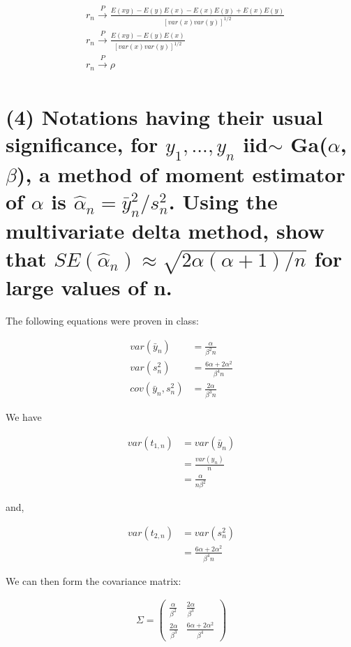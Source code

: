 \documentclass[11pt]{article}
\begin{document}
\begin{align*}
    &r_n \xrightarrow[]{P} \frac{E(xy)-E(y)E(x)-E(x)E(y)+E(x)E(y)}{[var(x)var(y)]^{1/2}}\\
    &r_n \xrightarrow[]{P} \frac{E(xy)-E(y)E(x)}{[var(x)var(y)]^{1/2}}\\
     &r_n \xrightarrow[]{P} \rho
\end{align*}


\section*{(4) Notations having their usual significance, for $y_1,...,y_n$
iid$\sim$ Ga($\alpha$,$\beta$), a
method of moment estimator of $\alpha$ is $\hat{\alpha}_n=\bar{y}^2_n / s^2_n$. Using the multivariate delta method, show that $SE(\hat{\alpha}_n) \approx \sqrt{2\alpha(\alpha+1)/n}$ for large values of n.}

 
The following equations were proven in class:

\begin{align*}
var(\bar{y}_n) &= \frac{\alpha}{\beta^2n}\\
var(s^2_n) &=\frac{6\alpha+2\alpha^2}{\beta^4n}\\
cov(\bar{y}_n, s^2_n) &= \frac{2\alpha}{\beta^3n}
    \end{align*}
    


We have

\begin{align*}
    var(t_{1,n}) &= var(\bar{y}_n)\\
    &= \frac{var(y_n)}{n} \\
    &= \frac{\alpha}{n\beta^2}
\end{align*}

and,

\begin{align*}
    var(t_{2,n}) &= var(s^2_n)\\
    &= \frac{6\alpha+2\alpha^2}{\beta^4n}
\end{align*}

We can then form the covariance matrix:


\begin{align*}
    \Sigma = \begin{pmatrix}
\frac{\alpha}{\beta^2} &\frac{2\alpha}{\beta^3}\\
\frac{2\alpha}{\beta^3} & \frac{6\alpha+2\alpha^2}{\beta^4}
\end{pmatrix} 
\end{align*}
\end{document}
